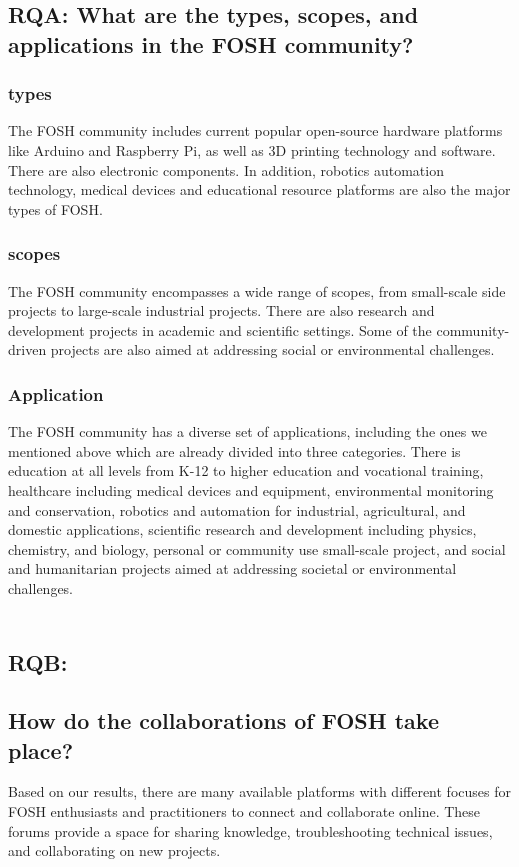 \documentclass[final-report.tex]{subfiles}
\begin{document}
\subsection{RQA: What are the types, scopes, and applications in the FOSH community?}

\subsubsection{types} 
The FOSH community includes current popular open-source hardware platforms like Arduino and Raspberry Pi, as well as 3D printing technology and software. There are also electronic components. In addition, robotics automation technology, medical devices and educational resource platforms are also the major types of FOSH.

\subsubsection{scopes}
The FOSH community encompasses a wide range of scopes, from small-scale side projects to large-scale industrial projects. There are also research and development projects in academic and scientific settings. Some of the community-driven projects are also aimed at addressing social or environmental challenges.

\subsubsection{Application}
The FOSH community has a diverse set of applications, including the ones we mentioned above which are already divided into three categories. There is education at all levels from K-12 to higher education and vocational training, healthcare including medical devices and equipment, environmental monitoring and conservation, robotics and automation for industrial, agricultural, and domestic applications, scientific research and development including physics, chemistry, and biology, personal or community use small-scale project, and social and humanitarian projects aimed at addressing societal or environmental challenges.
\\\\
\subsection{RQB: }

\subsection{How do the collaborations of FOSH take place?}
Based on our results, there are many available platforms with different focuses for FOSH enthusiasts and practitioners to connect and collaborate online. These forums provide a space for sharing knowledge, troubleshooting technical issues, and collaborating on new projects.
\end{document}
